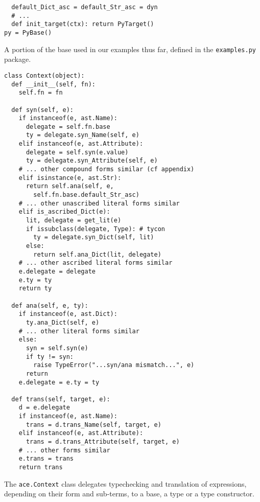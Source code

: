 {\begin{codelisting}
\begin{lstlisting}
  default_Dict_asc = default_Str_asc = dyn
  # ...
  def init_target(ctx): return PyTarget()   
py = PyBase()
\end{lstlisting}
\caption{A portion of the base used in our examples thus far, defined in the \texttt{examples.py} package.}
\label{pybase}
\end{codelisting}

\begin{codelisting}
\begin{lstlisting}
class Context(object):
  def __init__(self, fn):
    self.fn = fn
    
  def syn(self, e):
    if instanceof(e, ast.Name):
      delegate = self.fn.base
      ty = delegate.syn_Name(self, e)
    elif instanceof(e, ast.Attribute):
      delegate = self.syn(e.value)
      ty = delegate.syn_Attribute(self, e)
    # ... other compound forms similar (cf appendix)
    elif isinstance(e, ast.Str):
      return self.ana(self, e, 
        self.fn.base.default_Str_asc)
    # ... other unascribed literal forms similar
    elif is_ascribed_Dict(e):
      lit, delegate = get_lit(e)
      if issubclass(delegate, Type): # tycon
        ty = delegate.syn_Dict(self, lit)
      else:
        return self.ana_Dict(lit, delegate)
    # ... other ascribed literal forms similar
    e.delegate = delegate
    e.ty = ty
    return ty
    
  def ana(self, e, ty):
    if instanceof(e, ast.Dict):
      ty.ana_Dict(self, e)
    # ... other literal forms similar
    else:
      syn = self.syn(e)
      if ty != syn:
        raise TypeError("...syn/ana mismatch...", e)
      return
    e.delegate = e.ty = ty
    
  def trans(self, target, e):
    d = e.delegate
    if instanceof(e, ast.Name): 
      trans = d.trans_Name(self, target, e)
    elif instanceof(e, ast.Attribute):
      trans = d.trans_Attribute(self, target, e)
	# ... other forms similar
	e.trans = trans
	return trans
\end{lstlisting}
\caption{The \texttt{ace.Context} class delegates typechecking and translation of expressions, depending on their form and sub-terms, to a base, a type or a type constructor.}
\label{context}
\end{codelisting}


}
